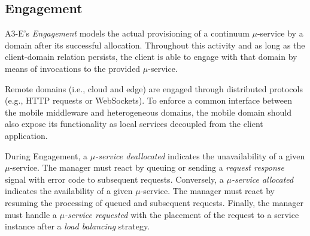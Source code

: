 
\subsection{Engagement}\label{sec:A3-E-engagement}

A3-E's \textit{Engagement} models the actual provisioning of a continuum $\mu$-service by a domain after its successful allocation.
Throughout this activity and as long as the client-domain relation persists, the client is able to engage with that domain by means of invocations to the provided $\mu$-service. 

Remote domains (i.e., cloud and edge) are engaged through distributed protocols (e.g., HTTP requests or WebSockets). To enforce a common interface between the mobile middleware and heterogeneous domains, the mobile domain should also expose its functionality as local services decoupled from the client application.

During Engagement, a \textit{$\mu$-service deallocated} indicates the unavailability of a given $\mu$-service. The manager must react by queuing or sending a \textit{request response} signal with error code to subsequent requests. Conversely, a \textit{$\mu$-service allocated} indicates the availability of a given $\mu$-service. The manager must react by resuming the processing of queued and subsequent requests. Finally, the manager must handle a \textit{$\mu$-service requested} with the placement of the request to a service instance after a \textit{load balancing} strategy.


%
%		
%		
%		

